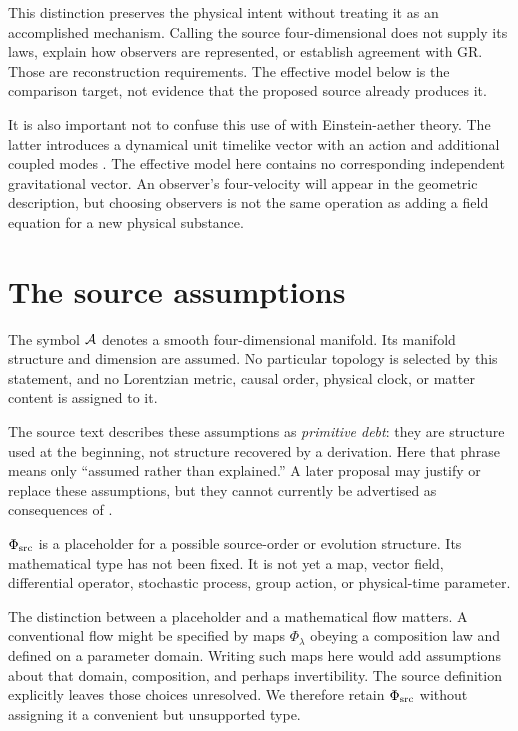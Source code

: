 \documentclass[11pt]{article}
\begin{document}
This distinction preserves the physical intent without treating it as an accomplished mechanism. Calling the source four-dimensional does not supply its laws, explain how observers are represented, or establish agreement with GR. Those are reconstruction requirements. The effective model below is the comparison target, not evidence that the proposed source already produces it.

It is also important not to confuse this use of \Aether{} with Einstein-aether theory. The latter introduces a dynamical unit timelike vector with an action and additional coupled modes \parencite{JacobsonMattingly2001,JacobsonMattingly2004}. The effective model here contains no corresponding independent gravitational vector. An observer's four-velocity will appear in the geometric description, but choosing observers is not the same operation as adding a field equation for a new physical substance.

\section{The source assumptions}
\begin{definition}
The symbol $\mathcal A$ denotes a smooth four-dimensional manifold. Its manifold structure and dimension are assumed. No particular topology is selected by this statement, and no Lorentzian metric, causal order, physical clock, or matter content is assigned to it.
\end{definition}
The source text describes these assumptions as \emph{primitive debt}: they are structure used at the beginning, not structure recovered by a derivation. Here that phrase means only ``assumed rather than explained.'' A later proposal may justify or replace these assumptions, but they cannot currently be advertised as consequences of \Aflow{}.

\begin{definition}
$\Phi_{\mathrm{src}}$ is a placeholder for a possible source-order or evolution structure. Its mathematical type has not been fixed. It is not yet a map, vector field, differential operator, stochastic process, group action, or physical-time parameter.
\end{definition}
The distinction between a placeholder and a mathematical flow matters. A conventional flow might be specified by maps $\Phi_\lambda$ obeying a composition law and defined on a parameter domain. Writing such maps here would add assumptions about that domain, composition, and perhaps invertibility. The source definition explicitly leaves those choices unresolved. We therefore retain $\Phi_{\mathrm{src}}$ without assigning it a convenient but unsupported type.
\end{document}
